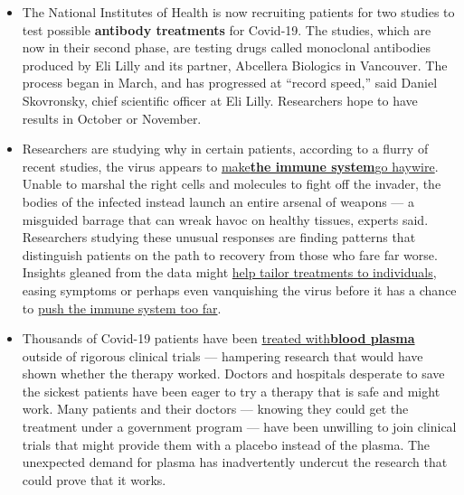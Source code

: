 \begin{itemize}
\item
  The National Institutes of Health is now recruiting patients for two
  studies to test possible \textbf{antibody treatments} for Covid-19.
  The studies, which are now in their second phase, are testing drugs
  called monoclonal antibodies produced by Eli Lilly and its partner,
  Abcellera Biologics in Vancouver. The process began in March, and has
  progressed at ``record speed,'' said Daniel Skovronsky, chief
  scientific officer at Eli Lilly. Researchers hope to have results in
  October or November.
\item
  Researchers are studying why in certain patients, according to a
  flurry of recent studies, the virus appears to
  \href{https://www.nytimes.com/2020/08/04/health/coronavirus-immune-system.html}{make}\textbf{\href{https://www.nytimes.com/2020/08/04/health/coronavirus-immune-system.html}{the
  immune
  system}}\href{https://www.nytimes.com/2020/08/04/health/coronavirus-immune-system.html}{go
  haywire}. Unable to marshal the right cells and molecules to fight off
  the invader, the bodies of the infected instead launch an entire
  arsenal of weapons --- a misguided barrage that can wreak havoc on
  healthy tissues, experts said. Researchers studying these unusual
  responses are finding patterns that distinguish patients on the path
  to recovery from those who fare far worse. Insights gleaned from the
  data might
  \href{https://www.nytimes.com/interactive/2020/science/coronavirus-drugs-treatments.html}{help
  tailor treatments to individuals}, easing symptoms or perhaps even
  vanquishing the virus before it has a chance to
  \href{https://www.nytimes.com/2020/04/01/health/coronavirus-cytokine-storm-immune-system.html}{push
  the immune system too far}.
\item
  Thousands of Covid-19 patients have been
  \href{https://www.nytimes.com/2020/08/04/health/blood-plasma-covid-19.html}{treated
  with}\textbf{\href{https://www.nytimes.com/2020/08/04/health/blood-plasma-covid-19.html}{blood
  plasma}} outside of rigorous clinical trials --- hampering research
  that would have shown whether the therapy worked. Doctors and
  hospitals desperate to save the sickest patients have been eager to
  try a therapy that is safe and might work. Many patients and their
  doctors --- knowing they could get the treatment under a government
  program --- have been unwilling to join clinical trials that might
  provide them with a placebo instead of the plasma. The unexpected
  demand for plasma has inadvertently undercut the research that could
  prove that it works.
\end{itemize}

